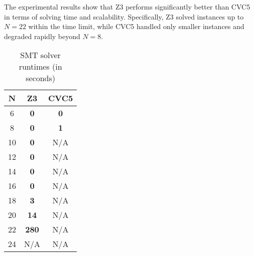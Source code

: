 The experimental results show that Z3 performs significantly better than CVC5 in terms of solving time and scalability. Specifically, Z3 solved instances up to $N=22$ within the time limit, while CVC5 handled only smaller instances and degraded rapidly beyond $N=8$.

\begin{table}[H]
\centering
\small
\begin{tabular}{|c|c|c|}
\toprule
\textbf{N} & \textbf{Z3} & \textbf{CVC5} \\
\midrule
6  & \textbf{0}   & \textbf{0}   \\
8  & \textbf{0}   & \textbf{1}   \\
10 & \textbf{0}   & N/A \\
12 & \textbf{0}   & N/A \\
14 & \textbf{0}   & N/A \\
16 & \textbf{0}   & N/A \\
18 & \textbf{3}   & N/A \\
20 & \textbf{14}  & N/A \\
22 & \textbf{280} & N/A \\
24 & N/A & N/A \\
\bottomrule
\end{tabular}
\caption{SMT solver runtimes (in seconds)}
\label{table:smt-result}
\end{table}

